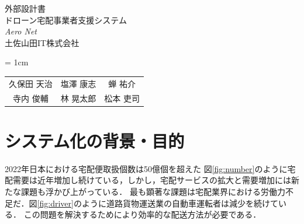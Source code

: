\documentclass[a4paper, titlepage]{jsarticle}
\date{\today}
\newcommand{\system}{\textsl{Aero Net}}
\begin{document}
\begin{titlepage}
  \centering
  \vspace*{150truept}
  {\Large 外部設計書}\\
  \vspace*{50truept}
  {\Huge ドローン宅配事業者支援システム} \\
  \vspace{15truept}
  {\Huge \system} \\
  \vspace{50truept}
  {\LARGE 土佐山田IT株式会社}\\
  \vspace{20truept}
  {\large{\tabcolsep = 1cm
      \begin{tabular}{ccc}
        久保田 天治 & 塩澤 康志 & 蝉 祐介  \\
        寺内 俊輔  & 林 晃太郎 & 松本 吏司
      \end{tabular}
    }}
\end{titlepage}
\newcommand{\fig}[2]{
  \begin{figure}[H]
    \centering
    \texttt{[image: flow/\#1.pdf]}
    \caption{#2}
    \label{fig:#1}
  \end{figure}
  \clearpage
}
\newcommand{\ui}[2]{
  \begin{figure}[H]
    \centering
    \fbox{
      \texttt{[image: ui/\#1]}
      }
    \caption{#2}
    \label{fig:#1}
  \end{figure}
}

\tableofcontents

\clearpage

\section{システム化の背景・目的}
2022年日本における宅配便取扱個数は50億個を超えた
図\ref{fig:number}のように宅配需要は近年増加し続けている，しかし，宅配サービスの拡大と需要増加には新たな課題も浮かび上がっている．
最も顕著な課題は宅配業界における労働力不足だ．図\ref{fig:driver}のように道路貨物運送業の自動車運転者は減少を続けている．
この問題を解決するためにより効率的な配送方法が必要である．
\end{document}

